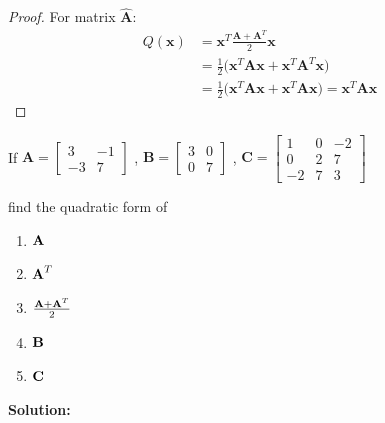 \documentclass[a4paper]{article}
\numberwithin{equation}{section} %
\newcommand\TheSolution{%
	\textbf{Solution:}\\%
}
\newcommand{\B}[1]{\textbf{\textup{#1}}} %
\begin{document}
\begin{proof}
For matrix $\hat{\textbf{A}}$:
\begin{equation*}
  \begin{split}
  Q(\textbf{x})&=\textbf{x}^{T}\frac{\textbf{A}+\textbf{A}^{T}}{2}\textbf{x}\\
  &=\frac{1}{2}\Big(\textbf{x}^{T}\textbf{A}\textbf{x} + \textbf{x}^{T}\textbf{A}^{T}\textbf{x}\Big)\\
  &=\frac{1}{2}\Big(\textbf{x}^{T}\textbf{A}\textbf{x}+\textbf{x}^{T}\textbf{A}\textbf{x}\Big)=\textbf{x}^{T}\textbf{A}\textbf{x}
  \end{split}
\end{equation*}
\end{proof}
\begin{exmp}
If $\textbf{A}=
\begin{bmatrix}
3 & -1\\
-3 & 7
\end{bmatrix}$
, $\textbf{B}=
\begin{bmatrix}
3 & 0\\
0 & 7
\end{bmatrix}$
, $\textbf{C}=
\begin{bmatrix}
1 &		0	& 	-2\\
0 &		2	& 	7\\
-2&		7	& 	3
\end{bmatrix}$

find the quadratic form of 

\begin{multicols}{2}
  \begin{enumerate} [label=(\alph*)]
  \item $\B{A}$
  \item $\B{A}^{T}$
  \item $\frac{\B{A}+\B{A}^{T}}{2}$
  \item $\B{B}$
  \item $\B{C}$
\end{enumerate}
\end{multicols}

\end{exmp}
\TheSolution
\end{document}

